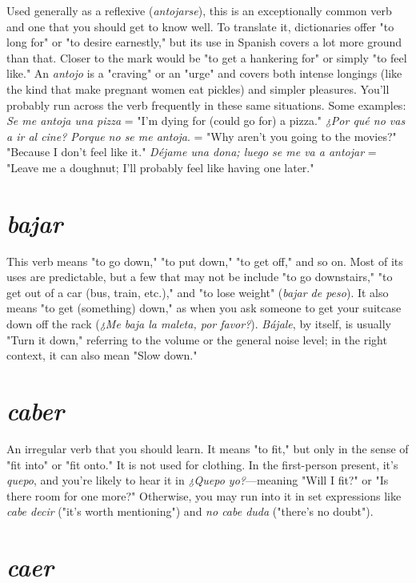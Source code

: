 \documentclass[14pt,a4paper,oneside]{memoir}
\begin{document}
Used generally as a reflexive (\emph{antojarse}), this is an exceptionally common verb and one that you should get to know well. To translate it, dictionaries offer "to long for" or "to desire earnestly," but its
use in Spanish covers a lot more ground than that. Closer to the mark
would be "to get a hankering for" or simply "to feel like." An \emph{antojo}
is a "craving" or an "urge" and covers both intense longings (like the
kind that make pregnant women eat pickles) and simpler pleasures.
You'll probably run across the verb frequently in these same situations. Some examples: \emph{Se me antoja una pizza} = "I'm dying for (could
go for) a pizza." \emph{¿Por qué no vas a ir al cine? Porque no se me antoja}.
= "Why aren't you going to the movies?" "Because I don't feel like it."
\emph{Déjame una dona; luego se me va a antojar} = "Leave me a doughnut;
I'll probably feel like having one later."

\section{\emph{bajar}}

This verb means "to go down," "to put down," "to get off,"
and so on. Most of its uses are predictable, but a few that may not be
include "to go downstairs," "to get out of a car (bus, train, etc.)," and
"to lose weight" (\emph{bajar de peso}). It also means "to get (something)
down," as when you ask someone to get your suitcase down off the
rack (\emph{¿Me baja la maleta, por favor?}). \emph{Bájale}, by itself, is usually "Turn
it down," referring to the volume or the general noise level; in the
right context, it can also mean "Slow down."

\section{\emph{caber}}

An irregular verb that you should learn. It means "to fit," but
only in the sense of "fit into" or "fit onto." It is not used for clothing.
In the first-person present, it's \emph{quepo}, and you're likely to hear it in
\emph{¿Quepo yo?}---meaning "Will I fit?" or "Is there room for one more?"
Otherwise, you may run into it in set expressions like \emph{cabe decir} ("it's
worth mentioning") and \emph{no cabe duda} ("there's no doubt").

\section{\emph{caer}}
\end{document}
